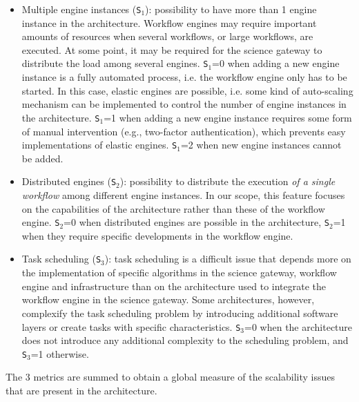 \documentclass[preprint,3p,twocolumn]{elsarticle}
\newcommand{\note}[2]{\pdfmargincomment[color=yellow,author=#1,open=true]{#2}}
\newcommand{\closednote}[4]{} %
\begin{document}
\begin{itemize}[leftmargin=0cm,itemindent=0.35cm,itemsep=0cm]
\item Multiple engine instances (\texttt{S$_1$}): possibility to have
  more than 1 engine instance in the architecture. Workflow engines
  may require important amounts of resources when several workflows,
  or large workflows, are executed. At some point, it may be required
  for the science gateway to distribute the load among several
  engines. \texttt{S$_1$}=0 when adding a new engine instance is a
  fully automated process, i.e. the workflow engine only has to be
  started. In this case, elastic engines are possible, i.e. some kind
  of auto-scaling mechanism can be implemented to control the number
  of engine instances in the architecture. \texttt{S$_1$}=1 when
  adding a new engine instance requires some form of manual
  intervention (e.g., two-factor authentication), which prevents easy
  implementations of elastic engines. \texttt{S$_1$}=2 when new engine
  instances cannot be added.
\item Distributed engines (\texttt{S$_2$}): possibility to distribute
  the execution \emph{of a single workflow} among different engine
  instances. In our scope, this feature focuses on the capabilities of
  the architecture rather than these of the workflow
  engine. \texttt{S$_2$}=0 when distributed engines are possible in
  the architecture, \texttt{S$_2$}=1 when they require specific
  developments in the workflow engine.  \closednote{Rafael}{$S_2$
    would be 2 if the paradigm does not allow to distribute the
    orchestration? e.g., workflow executions implemented within MPI
    jobs, in Pegasus PMC and dispel4Py.}{Tristan}{The problem is that
    it is very difficult to define ``does not allow to''. For
    instance, why couldn't you hack Pegasus PMC so much that it
    becomes possible to distribute workflow executions in several MPI
    jobs coordinated by an MPI job? Moreover, S2=2 is not used so I'd
    prefer to leave it like this, unless you have a suggestion to
    reflect this in the text.}
\item Task scheduling (\texttt{S$_3$}): task scheduling is a difficult
  issue that depends more on the implementation of specific algorithms
  in the science gateway, workflow engine and infrastructure than on
  the architecture used to integrate the workflow engine in the
  science gateway. Some architectures, however, complexify the task
  scheduling problem by introducing additional software layers or
  create tasks with specific characteristics. \texttt{S$_3$}=0 when
  the architecture does not introduce any additional complexity to the
  scheduling problem, and \texttt{S$_3$}=1 otherwise.
\end{itemize}
The 3 metrics are summed to obtain a global measure of the scalability
issues that are present in the architecture.
\end{document}
